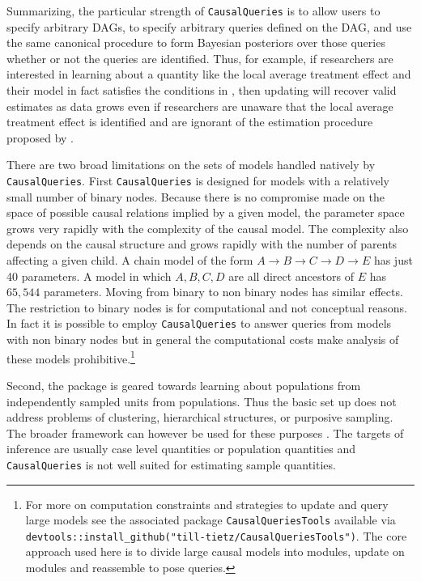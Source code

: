\documentclass[
  11pt,
  article]{jss}
\begin{document}
Summarizing, the particular strength of \texttt{CausalQueries} is to
allow users to specify arbitrary DAGs, to specify arbitrary queries
defined on the DAG, and use the same canonical procedure to form
Bayesian posteriors over those queries whether or not the queries are
identified. Thus, for example, if researchers are interested in learning
about a quantity like the local average treatment effect and their model
in fact satisfies the conditions in \citet{angrist_identification_1996},
then updating will recover valid estimates as data grows even if
researchers are unaware that the local average treatment effect is
identified and are ignorant of the estimation procedure proposed by
\citet{angrist_identification_1996}.

There are two broad limitations on the sets of models handled natively
by \texttt{CausalQueries}. First \texttt{CausalQueries} is designed for
models with a relatively small number of binary nodes. Because there is
no compromise made on the space of possible causal relations implied by
a given model, the parameter space grows very rapidly with the
complexity of the causal model. The complexity also depends on the
causal structure and grows rapidly with the number of parents affecting
a given child. A chain model of the form
\(A \rightarrow B \rightarrow C \rightarrow D \rightarrow E\) has just
40 parameters. A model in which \(A, B, C, D\) are all direct ancestors
of \(E\) has \(65,544\) parameters. Moving from binary to non binary
nodes has similar effects. The restriction to binary nodes is for
computational and not conceptual reasons. In fact it is possible to
employ \texttt{CausalQueries} to answer queries from models with non
binary nodes but in general the computational costs make analysis of
these models prohibitive.\footnote{For more on computation constraints
  and strategies to update and query large models see the associated
  package \texttt{CausalQueriesTools} available via
  \texttt{devtools::install\_github("till-tietz/CausalQueriesTools")}.
  The core approach used here is to divide large causal models into
  modules, update on modules and reassemble to pose queries.}

Second, the package is geared towards learning about populations from
independently sampled units from populations. Thus the basic set up does
not address problems of clustering, hierarchical structures, or
purposive sampling. The broader framework can however be used for these
purposes \citep[see section 9.4 of][]{humphreys_integrated_2023}. The
targets of inference are usually case level quantities or population
quantities and \texttt{CausalQueries} is not well suited for estimating
sample quantities.
\end{document}
